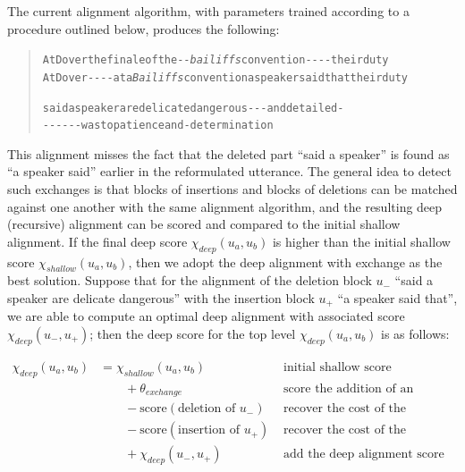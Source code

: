The current alignment algorithm, with parameters trained according to a
procedure outlined below, produces the following:

\begin{quote}\begin{alltt}\small
At Dover \textcolor{BrickRed}{the finale of the} -  - \emph{\textcolor{Sepia}{bailiffs}} convention - -       -    -    their duty
At Dover -   -      -  -   \textcolor{OliveGreen}{at a} \emph{\textcolor{Sepia}{Bailiffs}} convention \textcolor{OliveGreen}{a speaker said that} their duty

\textcolor{BrickRed}{said a speaker are delicate dangerous} -   -  -        and \textcolor{BrickRed}{detailed} -            
-    - -       -   -        -         \textcolor{OliveGreen}{was to patience} and -         \textcolor{OliveGreen}{determination}
\end{alltt}\end{quote}

This alignment misses the fact that the deleted part \enquote{said a
speaker} is found as \enquote{a speaker said} earlier in the
reformulated utterance. The general idea to detect such exchanges is
that blocks of insertions and blocks of deletions can be matched against
one another with the same alignment algorithm, and the resulting deep
(recursive) alignment can be scored and compared to the initial shallow
alignment. If the final deep score \(\chi_{deep}(u_a, u_b)\) is higher
than the initial shallow score \(\chi_{shallow}(u_a, u_b)\), then we
adopt the deep alignment with exchange as the best solution. Suppose
that for the alignment of the deletion block \(u_-\) \enquote{said a
speaker are delicate dangerous} with the insertion block \(u_+\)
\enquote{a speaker said that}, we are able to compute an optimal deep
alignment with associated score \(\chi_{deep}(u_-, u_+)\); then the deep
score for the top level \(\chi_{deep}(u_a, u_b)\) is as follows:

\begin{align}
  \chi_{deep}(u_a, u_b) & = \chi_{shallow}(u_a, u_b) & & \text{initial shallow score} \nonumber \\
              &\qquad {} + \theta_{exchange} & & \text{score the addition of an exchange operation} \nonumber \\
              &\qquad {} - \text{score}(\text{deletion of }u_-) & & \text{recover the cost of the deletion block} \nonumber \\
              &\qquad {} - \text{score}(\text{insertion of }u_+) & & \text{recover the cost of the insertion block} \nonumber \\
              &\qquad {} + \chi_{deep}(u_-, u_+) & & \text{add the deep alignment score of the exchange} \label{eq:exchange-score}
\end{align}

